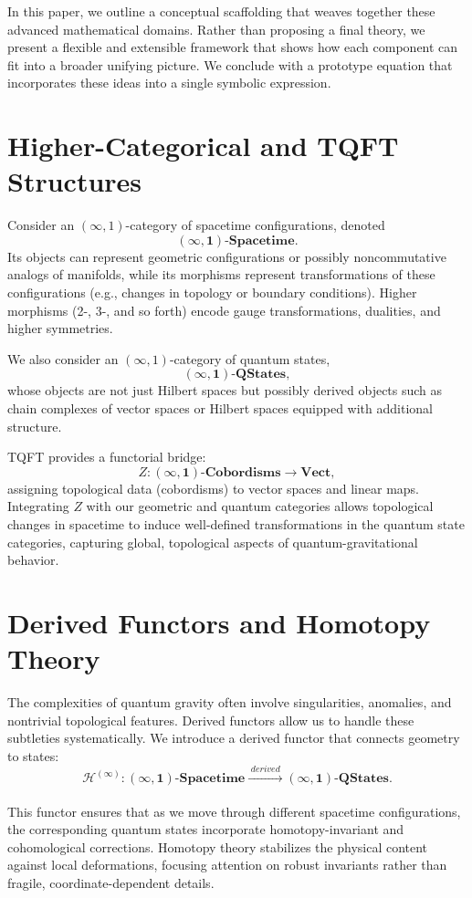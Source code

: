 \documentclass[12pt]{article}
\begin{document}
In this paper, we outline a conceptual scaffolding that weaves together these advanced mathematical domains. Rather than proposing a final theory, we present a flexible and extensible framework that shows how each component can fit into a broader unifying picture. We conclude with a prototype equation that incorporates these ideas into a single symbolic expression.

\section{Higher-Categorical and TQFT Structures}

Consider an $(\infty,1)$-category of spacetime configurations, denoted
\[
\mathbf{(\infty,1)\text{-Spacetime}}.
\]
Its objects can represent geometric configurations or possibly noncommutative analogs of manifolds, while its morphisms represent transformations of these configurations (e.g., changes in topology or boundary conditions). Higher morphisms (2-, 3-, and so forth) encode gauge transformations, dualities, and higher symmetries.

We also consider an $(\infty,1)$-category of quantum states,
\[
\mathbf{(\infty,1)\text{-QStates}},
\]
whose objects are not just Hilbert spaces but possibly derived objects such as chain complexes of vector spaces or Hilbert spaces equipped with additional structure.

TQFT provides a functorial bridge:
\[
Z : \mathbf{(\infty,1)\text{-Cobordisms}} \to \mathbf{Vect},
\]
assigning topological data (cobordisms) to vector spaces and linear maps. Integrating $Z$ with our geometric and quantum categories allows topological changes in spacetime to induce well-defined transformations in the quantum state categories, capturing global, topological aspects of quantum-gravitational behavior.

\section{Derived Functors and Homotopy Theory}

The complexities of quantum gravity often involve singularities, anomalies, and nontrivial topological features. Derived functors allow us to handle these subtleties systematically. We introduce a derived functor that connects geometry to states:
\[
\mathcal{H}^{(\infty)} : \mathbf{(\infty,1)\text{-Spacetime}} \xrightarrow[]{\;derived\;} \mathbf{(\infty,1)\text{-QStates}}.
\]

This functor ensures that as we move through different spacetime configurations, the corresponding quantum states incorporate homotopy-invariant and cohomological corrections. Homotopy theory stabilizes the physical content against local deformations, focusing attention on robust invariants rather than fragile, coordinate-dependent details.
\end{document}
